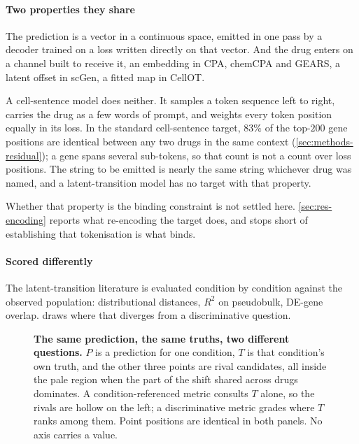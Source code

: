 \paragraph{Two properties they share} The prediction is a vector in a continuous
space, emitted in one pass by a decoder trained on a loss written directly on
that vector. And the drug enters on a channel built to receive it, an embedding
in CPA, chemCPA and GEARS, a latent offset in scGen, a fitted map in CellOT.

A cell-sentence model does neither. It samples a token sequence left to right,
carries the drug as a few words of prompt, and weights every token position
equally in its loss. In the standard cell-sentence target, $83\%$ of the
top-$200$ gene positions are identical between any two drugs in the same context
(\cref{sec:methods-residual}); a gene spans several sub-tokens, so that count is
not a count over loss positions. The string to be emitted is nearly the same string
whichever drug was named, and a latent-transition model has no target with that
property.

Whether that property is the binding constraint is not settled here.
\cref{sec:res-encoding} reports what re-encoding the target does, and stops
short of establishing that tokenisation is what binds.

\paragraph{Scored differently} The latent-transition literature is evaluated
condition by condition against the observed population: distributional distances,
$R^2$ on pseudobulk, DE-gene overlap.  draws where that
diverges from a discriminative question.

\begin{figure}[htbp]
\centering

\caption[Two questions about one prediction]{\textbf{The same prediction, the
same truths, two different questions.} $P$ is a prediction for one condition, $T$
is that condition's own truth, and the other three points are rival candidates,
all inside the pale region when the part of the shift shared across drugs
dominates. A
condition-referenced metric consults $T$ alone, so the rivals are hollow on the
left; a discriminative metric grades where $T$ ranks among them. Point positions
are identical in both panels. No axis carries a value.}
\label{fig:two-questions}
\end{figure}

